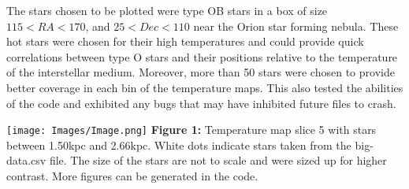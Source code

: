 \documentclass{article}
\begin{document}
The stars chosen to be plotted were type OB stars in a box of size $115 < RA < 170$, and $25 < Dec < 110$ near the Orion star forming nebula. These hot stars were chosen for their high temperatures and could provide quick correlations between type O stars and their positions relative to the temperature of the interstellar medium. Moreover, more than 50 stars were chosen to provide better coverage in each bin of the temperature maps. This also tested the abilities of the code and exhibited any bugs that may have inhibited future files to crash. \\

\begin{center}
\texttt{[image: Images/Image.png]}
\textbf{Figure 1:} Temperature map slice 5 with stars between 1.50kpc and 2.66kpc. White dots indicate stars taken from the big-data.csv file. The size of the stars are not to scale and were sized up for higher contrast. More figures can be generated in the code.
\end{center}
\end{document}
